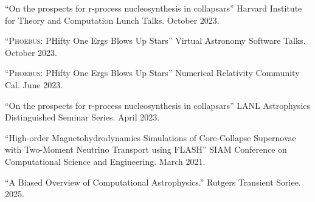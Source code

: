 \documentclass[11pt]{vitae}
\begin{document}
\begin{publist}

\item ``On the prospects for r-process nucleosynthesis in collapsars'' Harvard Institute for Theory and Computation Lunch Talks. October 2023.

\item ``\textsc{Phoebus}: PHifty One Ergs Blows Up Stars'' Virtual Astronomy Software Talks. October 2023.

\item ``\textsc{Phoebus}: PHifty One Ergs Blows Up Stars'' Numerical Relativity Community Cal. June 2023.

\item ``On the prospects for r-process nucleosynthesis in collapsars'' LANL Astrophysics Distinguished Seminar Series. April 2023.

\item ``High-order Magnetohydrodynamics Simulations of Core-Collapse Supernovae with Two-Moment Neutrino Transport using FLASH'' SIAM Conference on Computational Science and Engineering. March 2021.

\end{publist}


\begin{publist}

\item ``A Biased Overview of Computational Astrophysics.'' Rutgers Transient Soriee. 2025.

\end{publist}

\end{document}
